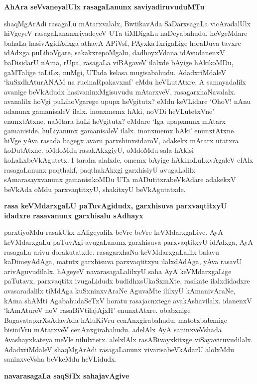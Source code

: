 {\bigskip
\noindent
{\large\bf AhAra seVvaneyalUlx rasagaLanunx saviyadiruvuduMTu}}\label{page221a}
\medskip

\noindent
shaqMgArAdi rasagaLu mAtarxvalalx, BwtikavAda SaDarxsagaLa vicAradalUlx hiVgeyeV rasagaLananxriyadeyeV UTa tiMDigaLu naDeyabahudu. heVgeMdare bahaLa hasivAgidAdxga athavA APiVsf, PAyxkaTxrigaLige horaDuva tavxre idAdxga puLihoVgare, sakakxrepoMgalu, dadhoyxVdana idAvudanenxV baDisidarU nAma, rUpa, rasagaLa viBAgaveV ilalxde bAyige hAkikoMDu, gaMTalige taLiLx, nuMgi, UTada kelasa mugisabahudu. AdadxriMdaleV `kuSxdhAturANAM na rucinaRpakavxmf'\label{221} eMdu heVLutAtxre. A samayadalilx avanige beVkAdudx hasivaninxMgisuvudu mAtarxveV, rasagarxhaNavalalx. avanalilx hoVgi puLihoVgarege upupx heVgitutx? eMdu keVLidare `OhoV! nAnu adanunx gamanisaleV ilalx. inonxmemx hAki, noVDi heVLutetxVne' enunxtAtxne. naMtara huLi heVgitutx? eMdare `Iga upapxnunx mAtarx gamaniside. huLiyanunx gamanisaleV ilalx. inonxmemx hAki' enunxtAtxne. hiVge yAva rasada bagegx avaru parxshinxsidaroV, adakekx mAtarx utatxra koDutAtxne. oMdoMdu rasakAkxgiyU, oMdoMdu sala hAkisi koLaLxbeVkAgutetx. I taraha alalxde, omemx bAyige hAkikoLuLxvAgaleV elAlx rasagaLanunx paqthakf, paqthakAkxgi garxhisiyU avugaLalilx sAmarasayxvanunx gamanisikoMDu UTa mADutitxrabeVkAdare adakekxV beVkAda oMdu parxvaqtitxyU, shakitxyU beVkAgutatxde.

{\bigskip
\noindent
{\large\bf rasa keVMdarxgaLU paTuvAgidudx, garxhisuva parxvaqtitxyU idadxre rasavanunx garxhisalu sAdhayx}}\label{page222}
\medskip

\noindent
parxtiyoMdu rasakUkx nAligeyalilx beVre beVre keVMdarxgaLive. AyA keVMdarxgaLu paTuvAgi avugaLanunx garxhisuva parxvaqtitxyU idAdxga, AyA rasagaLa arivu dorakutatxde. rasagarxhaNa keVMdarxgaLalilx balavu kaDimeyAdAga, matutx garxhisuva parxvaqtitxyu ilalxdAdAga, yAva rasavU arivAguvudilalx. hAgeyeV navarasagaLalilxyU saha AyA keVMdarxgaLige paTutavx, parxvaqtitx ivugaLidudx budidhxsUkaSxmXte, rasikate ilalxdidadxre avasaradalilx tiMdAga kuSxninxvAraNe AguvaMte ililxyU kAmanivAraNe, kAma shAMti AgabahudaSeTxV horatu rasajacnxtege avakAshavilalx. idanenxV `kAmAtureV noV rasaBiVtilajAjxH'\label{222} enunxtAtxre. obabxnige BagavatapxrXsAdavAda hAluKiVru cenAnxgirabahudu. matotxbabxnige bisiniVru mAtarxveV cenAnxgirabahudu. adelAlx AyA saninxveVshada Avashayxkateya meVle nilulxtetx. alelxlAlx rasABivayxkitxge viSayaviruvudilalx. AdadxriMdaleV shaqMgArAdi rasagaLanunx vivarisabeVkAdarU alolxMdu saninxveVsha beVkeMdu heVLidudx.

{\bigskip
\noindent
{\large\bf navarasagaLa saqSiTx sahajavAgive}}\label{page222a}
\medskip

